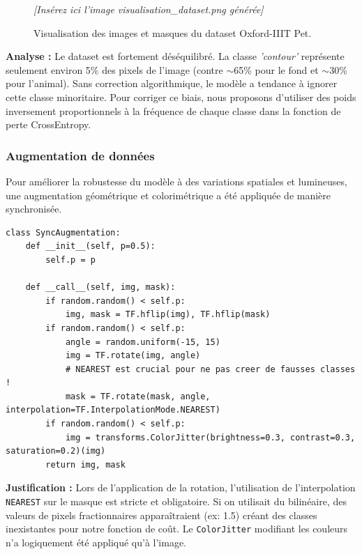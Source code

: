\documentclass[12pt, a4paper]{article}
\begin{document}
\begin{figure}[H]
    \centering
    \textit{[Insérez ici l'image visualisation\_dataset.png générée]}
    \caption{Visualisation des images et masques du dataset Oxford-IIIT Pet.}
\end{figure}

\textbf{Analyse :} Le dataset est fortement déséquilibré. La classe \textit{'contour'} représente seulement environ 5\% des pixels de l'image (contre $\sim$65\% pour le fond et $\sim$30\% pour l'animal). Sans correction algorithmique, le modèle a tendance à ignorer cette classe minoritaire. Pour corriger ce biais, nous proposons d'utiliser des poids inversement proportionnels à la fréquence de chaque classe dans la fonction de perte CrossEntropy.

\subsubsection*{Augmentation de données}
Pour améliorer la robustesse du modèle à des variations spatiales et lumineuses, une augmentation géométrique et colorimétrique a été appliquée de manière synchronisée.

\begin{lstlisting}
class SyncAugmentation:
    def __init__(self, p=0.5):
        self.p = p

    def __call__(self, img, mask):
        if random.random() < self.p:
            img, mask = TF.hflip(img), TF.hflip(mask)
        if random.random() < self.p:
            angle = random.uniform(-15, 15)
            img = TF.rotate(img, angle)
            # NEAREST est crucial pour ne pas creer de fausses classes !
            mask = TF.rotate(mask, angle, interpolation=TF.InterpolationMode.NEAREST)
        if random.random() < self.p:
            img = transforms.ColorJitter(brightness=0.3, contrast=0.3, saturation=0.2)(img)
        return img, mask
\end{lstlisting}

\textbf{Justification :} Lors de l'application de la rotation, l'utilisation de l'interpolation \texttt{NEAREST} sur le masque est stricte et obligatoire. Si on utilisait du bilinéaire, des valeurs de pixels fractionnaires apparaîtraient (ex: 1.5) créant des classes inexistantes pour notre fonction de coût. Le \texttt{ColorJitter} modifiant les couleurs n'a logiquement été appliqué qu'à l'image.
\end{document}
